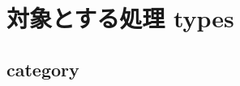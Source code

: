 \documentclass[letterpaper,10pt,dvipdfmx]{sphinxmanual}
\begin{document}
\begin{sphinxVerbatim}[commandchars=\\\{\}]
 
\end{sphinxVerbatim}


\chapter{対象とする処理 types}
\label{\detokenize{index:types}}

\section{category}
\label{\detokenize{Transform/types/category::doc}}\label{\detokenize{Transform/types/category:category}}
\end{document}
